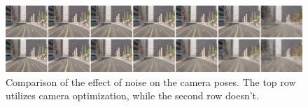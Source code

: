 \begin{figure}[!h]
    \centering
    \includegraphics[width=1.0\textwidth]{figures/noise-baseline-segments.png}
    \caption{Comparison of the effect of noise on the camera poses. The top row utilizes camera optimization, while the second row doesn't.}
    \label{fig:noise-baseline-segments}
\end{figure}